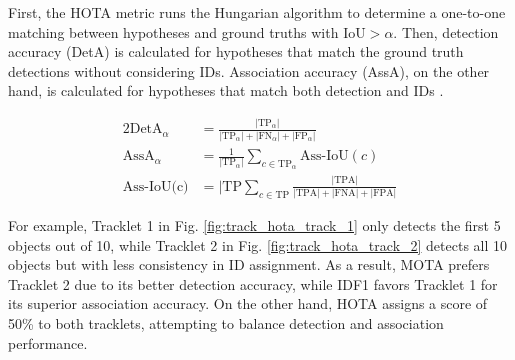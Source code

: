 First, the HOTA metric runs the Hungarian algorithm to determine a one-to-one matching between hypotheses and ground truths with $\text{IoU} > \alpha$. Then, detection accuracy (DetA) is calculated for hypotheses that match the ground truth detections without considering IDs. Association accuracy (AssA), on the other hand, is calculated for hypotheses that match both detection and IDs \citep{Luiten2020IJCV}.

\begin{alignat}{2}
    \text{DetA}_{\alpha} &= \frac{|\text{TP}_{\alpha}|}{|\text{TP}_\alpha| + |\text{FN}_\alpha| + |\text{FP}_\alpha|} \\
    \text{AssA}_{\alpha} &= \frac{1}{|\text{TP}_\alpha|} \sum_{c \in \text{TP}_\alpha} \text{Ass-IoU}(c) \\
    \text{Ass-IoU(c)} &= {|\text{TP}}\sum_{c \in \text{TP}} \frac{|\text{TPA}|}{|\text{TPA}|+|\text{FNA}| + |\text{FPA}|}
\end{alignat}


For example, Tracklet 1 in Fig. \ref{fig:track_hota_track_1} only detects the first 5 objects out of 10, while Tracklet 2 in Fig. \ref{fig:track_hota_track_2} detects all 10 objects but with less consistency in ID assignment. As a result, MOTA prefers Tracklet 2 due to its better detection accuracy, while IDF1 favors Tracklet 1 for its superior association accuracy. On the other hand, HOTA assigns a score of 50\% to both tracklets, attempting to balance detection and association performance.


